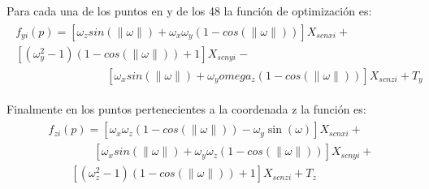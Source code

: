        	Para cada una de los puntos en y de los 48 la función de optimización es:
       	\begin{eqnarray}
       	\begin{array}{c}
       	f_{yi}(p)=[\omega_zsin(\parallel\omega\parallel)+\omega_x\omega_y(1-cos(\parallel\omega\parallel))]X_{scnxi}+\\
       	\left[(\omega_y^2-1)(1-cos(\parallel\omega\parallel))+1\right]X_{scnyi}-\\
       	\qquad \qquad \qquad \qquad
       	\left[\omega_xsin(\parallel\omega\parallel)+\omega_y omega_z(1-cos(\parallel\omega\parallel))\right]X_{scnzi}+T_y
       	\end{array}
       	\end{eqnarray}
       	
       	Finalmente en los puntos pertenecientes a la coordenada z la función es:
       	\begin{eqnarray}
       	\begin{array}{c}
       	f_{zi}(p)=[\omega_x\omega_z(1-cos(\parallel\omega\parallel))-\omega_y\sin(\omega)]X_{scnxi}+\\
       	\qquad \qquad
       	\left[\omega_xsin(\parallel\omega\parallel)+\omega_y\omega_z(1-cos(\parallel\omega\parallel))\right]X_{scnyi}+\\
       	\qquad	
       	\left[(\omega_z^2-1)(1-cos(\parallel\omega\parallel))+1\right]X_{scnzi}+T_z
       	\end{array}
       	\end{eqnarray}
       	
